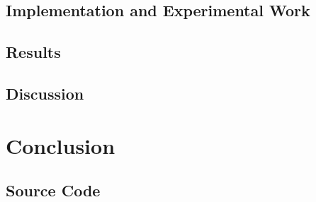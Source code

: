 \documentclass[11pt,a4paper]{report}
\begin{document}
		\section{Implementation and Experimental Work}
		\section{Results}
		\section{Discussion}
		
	\chapter{Conclusion}
	
	
	
	\nocite{*}
	
	\begin{appendices}
		\chapter{Source Code}
	\end{appendices}
\end{document}
